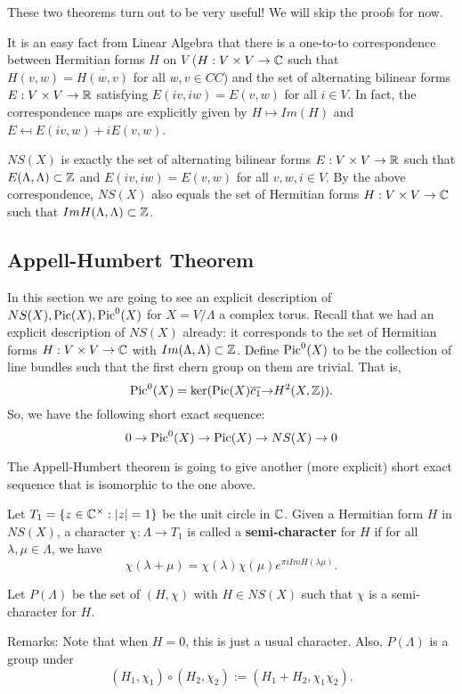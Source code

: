 These two theorems turn out to be very useful! We will skip the proofs for now. 

It is an easy fact from Linear Algebra that there is a one-to-to correspondence between Hermitian forms $H$ on $V$ ($H:V\times V\to {\mathbb C}$ such that $H(v,w)=\overline{H(w,v)}$ for all $w,v\in CC$) and the set of alternating bilinear forms $E:V\times V\to {\mathbb R}$ satisfying $E(iv,iw)=E(v,w)$ for all $i\in V$. In fact, the correspondence maps are explicitly given by 
$H\mapsto Im(H)$
and 
$E\mapsfrom E(iv,w)+iE(v,w)$. 

\begin{corollary}
$NS(X)$ is exactly the set of alternating bilinear forms $E: V\times V\to {\mathbb R}$ such that $E(\Lambda,\Lambda)\subset {\mathbb Z}$ and $E(iv,iw)=E(v,w)$ for all $v,w,i\in V$. By the above correspondence, $NS(X)$ also equals the set of Hermitian forms $H:V\times V\to {\mathbb C}$ such that $Im H(\Lambda,\Lambda)\subset {\mathbb Z}$. 
\end{corollary}


\subsection{Appell-Humbert Theorem}

In this section we are going to see an explicit description of $NS(X),\operatorname{Pic}(X),\operatorname{Pic}^0(X)$ for $X=V/\Lambda$ a complex torus. Recall that we had an explicit description of $NS(X)$ already: it corresponds to the set of Hermitian forms $H:V\times V\to {\mathbb C}$ with $Im(\Lambda,\Lambda)\subset {\mathbb Z}$. Define $\operatorname{Pic}^0(X)$ to be the collection of line bundles such that the first chern group on them are trivial. That is, 
$$\operatorname{Pic}^0(X)=\ker(\operatorname{Pic}(X)\overline{c_1}{\to} H^2(X,{\mathbb Z})).$$
So, we have the following short exact sequence:
$$0\to \operatorname{Pic}^0(X)\to \operatorname{Pic}(X)\to NS(X)\to 0$$

The Appell-Humbert theorem is going to give another (more explicit) short exact sequence that is isomorphic to the one above. 


Let $T_1=\{z\in {\mathbb C}^\times: |z|=1\}$ be the unit circle in ${\mathbb C}$. Given a Hermitian form $H$ in $NS(X)$, a character $\chi:\Lambda\to T_1$ is called a \textbf{semi-character} for $H$ if for all $\lambda,\mu\in \Lambda$, we have
$$\chi(\lambda+\mu)=\chi(\lambda)\chi(\mu)e^{\pi i Im H(\lambda\mu)}.$$

Let $P(\Lambda)$ be the set of $(H,\chi)$ with $H\in NS(X)$ such that $\chi$ is a semi-character for $H$.

Remarks: Note that when $H=0$, this is just a usual character. Also, $P(\Lambda)$ is a group under
$$(H_1,\chi_1)\circ (H_2,\chi_2):=(H_1+H_2,\chi_1\chi_2).$$


